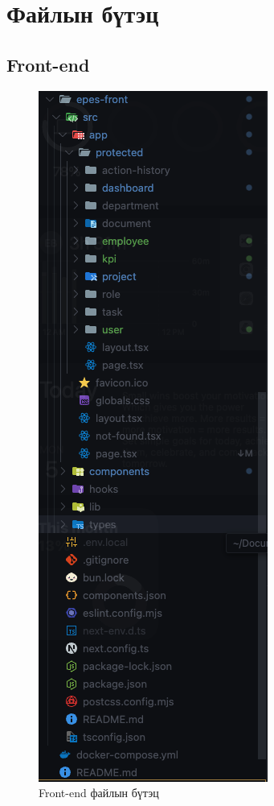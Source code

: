 \section{Файлын бүтэц}

\subsection{Front-end}

\begin{figure}[H]
    \centering
    \includegraphics[scale=0.5]{src/images/uiux/frontFileStruc.png}
    \caption{Front-end файлын бүтэц}
    \label{fig:front_file_struct}
\end{figure}

